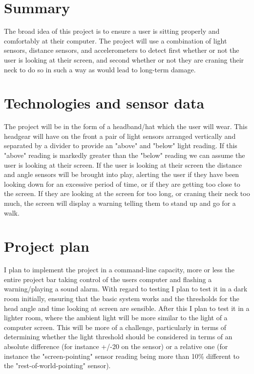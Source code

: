 \documentclass[12pt, a4paper]{article}
\begin{document}
\maketitle

\section{Summary} %
The broad idea of this project is to ensure a user is sitting properly and comfortably at their computer.
The project will use a combination of light sensors, distance sensors, and accelerometers to detect first whether or not the user is looking at their screen, and second whether or not they are craning their neck to do so in such a way as would lead to long-term damage.

\section{Technologies and sensor data} %

The project will be in the form of a headband/hat which the user will wear.
This headgear will have on the front a pair of light sensors arranged vertically and separated by a divider to provide an "above" and "below" light reading. If this "above" reading is markedly greater than the "below" reading we can assume the user is looking at their screen.
If the user is looking at their screen the distance and angle sensors will be brought into play, alerting the user if they have been looking down for an excessive period of time, or if they are getting too close to the screen.
If they are looking at the screen for too long, or craning their neck too much, the screen will display a warning telling them to stand up and go for a walk.

\section{Project plan} %
I plan to implement the project in a command-line capacity, more or less the entire project bar taking control of the users computer and flashing a warning/playing a sound alarm.
With regard to testing I plan to test it in a dark room initially, ensuring that the basic system works and the thresholds for the head angle and time looking at screen are sensible.
After this I plan to test it in a lighter room, where the ambient light will be more similar to the light of a computer screen.
This will be more of a challenge, particularly in terms of determining whether the light threshold should be considered in terms of an absolute difference (for instance +/-20 on the sensor) or a relative one (for instance the "screen-pointing" sensor reading being more than 10\% different to the "rest-of-world-pointing" sensor).
\end{document}
